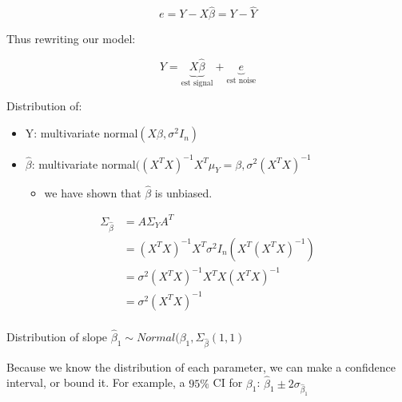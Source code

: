 \documentclass{report}
\begin{document}
\[
e = Y - X \hat \beta = Y - \hat Y
\]

Thus rewriting our model:

\[
	Y = \underbrace{X\hat \beta}_{\text{est signal}}  +\underbrace{e}_{\text{est noise}} 
\]


Distribution of: 

\begin{itemize}
	\item Y: multivariate normal$(X\beta, \sigma^{2} I_{n} )$
	\item $\hat \beta$: multivariate normal$( \left( X^{T}X \right) ^{-1} X^{T} \mu _{Y} = \beta, \sigma^{2} \left( X^{T}X \right) ^{-1} $ 
		\begin{itemize}
			\item we have shown that $\hat \beta$ is unbiased.
		\end{itemize}
\end{itemize}


\begin{align*}
	\Sigma_{\hat \beta} &= A\Sigma_{Y}A^{T} \\
	&= (X^{T}X)^{-1}X^{T} \sigma^{2} I_{n} \left( X^{T} (X^{T}X)^{-1} \right)  \\
	&= \sigma^{2} (X^{T}X)^{-1} X^{T} X (X^{T}X)^{-1} \\
	&= \sigma^{2} (X^{T}X)^{-1} \\
\end{align*}


Distribution of slope $\hat \beta_{1} \sim Normal(\beta_{1}, \Sigma_{\hat \beta}(1,1) $ 

Because we know the distribution of each parameter, we can make a confidence interval, or bound it. For example, a $95\%$ CI for $\beta _{1}$: $\hat \beta_{1} \pm 2 \sigma_{\hat \beta _{1}}$  
\end{document}
